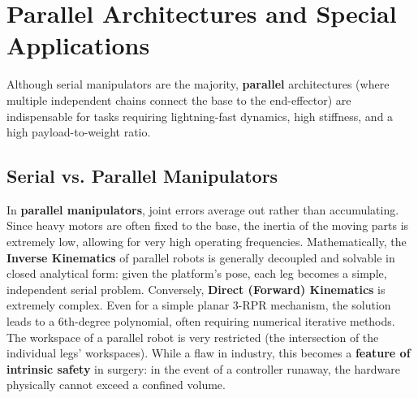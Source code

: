 \documentclass[11pt,a4paper,twoside]{report}
\begin{document}
\chapter{Parallel Architectures and Special Applications}

Although serial manipulators are the majority, \textbf{parallel} architectures (where multiple independent chains connect the base to the end-effector) are indispensable for tasks requiring lightning-fast dynamics, high stiffness, and a high payload-to-weight ratio.

\section{Serial vs. Parallel Manipulators}
In \textbf{parallel manipulators}, joint errors average out rather than accumulating. Since heavy motors are often fixed to the base, the inertia of the moving parts is extremely low, allowing for very high operating frequencies.
Mathematically, the \textbf{Inverse Kinematics} of parallel robots is generally decoupled and solvable in closed analytical form: given the platform's pose, each leg becomes a simple, independent serial problem.
Conversely, \textbf{Direct (Forward) Kinematics} is extremely complex. Even for a simple planar 3-RPR mechanism, the solution leads to a 6th-degree polynomial, often requiring numerical iterative methods.
The workspace of a parallel robot is very restricted (the intersection of the individual legs' workspaces). While a flaw in industry, this becomes a \textbf{feature of intrinsic safety} in surgery: in the event of a controller runaway, the hardware physically cannot exceed a confined volume.
\end{document}
